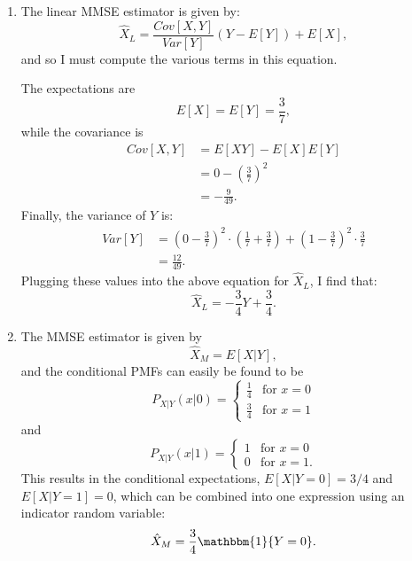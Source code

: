 \begin{problem}{11} $ $

\begin{enumerate}
\item The linear MMSE estimator is given by:
\begin{equation*}
\hat X_L = \frac{Cov[X, Y]}{Var[Y]}(Y-E[Y])+E[X],
\end{equation*}
and so I must compute the various terms in this equation.

The expectations are 
\begin{equation*}
E[X] = E[Y]=\frac{3}{7},
\end{equation*}
while the covariance is
\begin{align*}
Cov[X, Y] &= E[XY]-E[X]E[Y] \\
& = 0-\left (\frac{3}{7}\right)^2 \\
& = -\frac{9}{49}.
\end{align*}
Finally, the variance of $Y$ is:
\begin{align*}
Var[Y] &= \left (0-\frac{3}{7} \right)^2 \cdot \left (\frac{1}{7}+\frac{3}{7}\right)+\left(1-\frac{3}{7}\right)^2 \cdot \frac{3}{7} \\
& = \frac{12}{49}.
\end{align*}
Plugging these values into the above equation for $\hat X_L$,  I find that:
\begin{equation*}
\hat X_L = -\frac{3}{4}Y + \frac{3}{4}.
\end{equation*}

\item The MMSE estimator is given by 
\begin{equation*}
\hat X_M = E[X|Y],
\end{equation*}
and the conditional PMFs can easily be found to be
\[
P_{X|Y}(x|0)=
  \begin{cases}
                                   \frac{1}{4}& \text{for $x=0$} \\
                                   \frac{3}{4} & \text{for $x=1$}
  \end{cases}
\]
and
\[
P_{X|Y}(x|1)=
  \begin{cases}
                                  1& \text{for $x=0$} \\
                                   0 & \text{for $x=1$}.
  \end{cases}
\]
This results in the conditional expectations, $E[X|Y=0] = 3/4$ and $E[X|Y=1] = 0$, which can be combined into one expression using an indicator random variable:
\begin{equation*}
\hat X_M = \frac{3}{4} \mathbbm{1} \{ Y=0\}.
\end{equation*}


\end{enumerate}
\end{problem}
